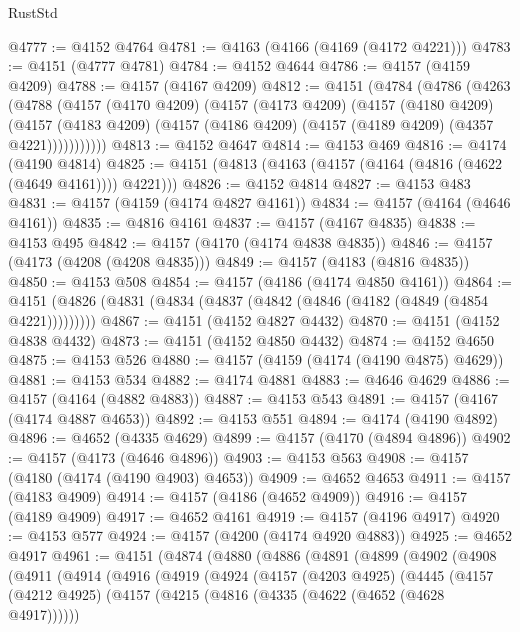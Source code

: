 \begin{lexlean}{RustStd}
\begin{coremodule}
@4777 := @4152 @4764
@4781 := @4163 (@4166 (@4169 (@4172 @4221)))
@4783 := @4151 (@4777 @4781)
@4784 := @4152 @4644
@4786 := @4157 (@4159 @4209)
@4788 := @4157 (@4167 @4209)
@4812 := @4151
    (@4784
      (@4786
        (@4263
          (@4788
            (@4157
              (@4170 @4209)
              (@4157
                (@4173 @4209)
                (@4157
                  (@4180 @4209)
                  (@4157
                    (@4183 @4209)
                    (@4157 (@4186 @4209) (@4157 (@4189 @4209) (@4357 @4221)))))))))))
@4813 := @4152 @4647
@4814 := @4153 @469
@4816 := @4174 (@4190 @4814)
@4825 := @4151 (@4813 (@4163 (@4157 (@4164 (@4816 (@4622 (@4649 @4161)))) @4221)))
@4826 := @4152 @4814
@4827 := @4153 @483
@4831 := @4157 (@4159 (@4174 @4827 @4161))
@4834 := @4157 (@4164 (@4646 @4161))
@4835 := @4816 @4161
@4837 := @4157 (@4167 @4835)
@4838 := @4153 @495
@4842 := @4157 (@4170 (@4174 @4838 @4835))
@4846 := @4157 (@4173 (@4208 (@4208 @4835)))
@4849 := @4157 (@4183 (@4816 @4835))
@4850 := @4153 @508
@4854 := @4157 (@4186 (@4174 @4850 @4161))
@4864 := @4151 (@4826 (@4831 (@4834 (@4837 (@4842 (@4846 (@4182 (@4849 (@4854 @4221)))))))))
@4867 := @4151 (@4152 @4827 @4432)
@4870 := @4151 (@4152 @4838 @4432)
@4873 := @4151 (@4152 @4850 @4432)
@4874 := @4152 @4650
@4875 := @4153 @526
@4880 := @4157 (@4159 (@4174 (@4190 @4875) @4629))
@4881 := @4153 @534
@4882 := @4174 @4881
@4883 := @4646 @4629
@4886 := @4157 (@4164 (@4882 @4883))
@4887 := @4153 @543
@4891 := @4157 (@4167 (@4174 @4887 @4653))
@4892 := @4153 @551
@4894 := @4174 (@4190 @4892)
@4896 := @4652 (@4335 @4629)
@4899 := @4157 (@4170 (@4894 @4896))
@4902 := @4157 (@4173 (@4646 @4896))
@4903 := @4153 @563
@4908 := @4157 (@4180 (@4174 (@4190 @4903) @4653))
@4909 := @4652 @4653
@4911 := @4157 (@4183 @4909)
@4914 := @4157 (@4186 (@4652 @4909))
@4916 := @4157 (@4189 @4909)
@4917 := @4652 @4161
@4919 := @4157 (@4196 @4917)
@4920 := @4153 @577
@4924 := @4157 (@4200 (@4174 @4920 @4883))
@4925 := @4652 @4917
@4961 := @4151
    (@4874
      (@4880
        (@4886
          (@4891
            (@4899
              (@4902
                (@4908
                  (@4911
                    (@4914
                      (@4916
                        (@4919
                          (@4924
                            (@4157
                              (@4203 @4925)
                              (@4445
                                (@4157
                                  (@4212 @4925)
                                  (@4157
                                    (@4215 (@4816 (@4335 (@4622 (@4652 (@4628 @4917))))))

\end{coremodule}
\end{lexlean}
